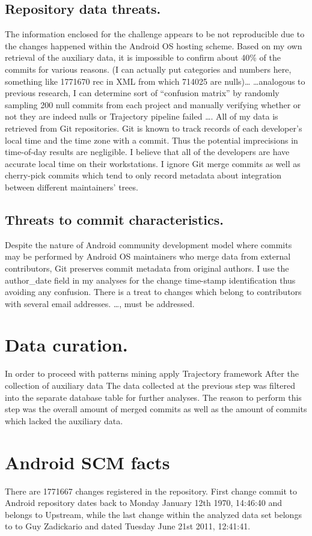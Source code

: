 \documentclass[a4paper,10pt]{article}
\numberwithin{equation}{subsection}
\begin{document}
\subsection{Repository data threats.}
The information enclosed for the challenge appears to be not reproducible due to the changes happened 
within the Android OS hosting scheme. Based on my own retrieval of the auxiliary data, it is impossible 
to confirm about 40\% of the commits for various reasons. 
(I can actually put categories and numbers here, something like
1771670 rec in XML from which 714025 are nulls)\ldots 
\ldots analogous to previous research, I can determine sort of ``confusion matrix'' by 
randomly sampling 200 null commits from each project and manually verifying whether or not they 
are indeed nulls or Trajectory pipeline failed \ldots. 
All of my data is retrieved from Git repositories. Git is known to track records of each 
developer’s local time and the time zone with a commit. Thus the potential imprecisions
in time-of-day results are negligible. I believe that all of the developers are have accurate local 
time on their workstations.
I ignore Git merge commits as well as cherry-pick commits which tend to only record metadata about 
integration between different maintainers’ trees.

\subsection{Threats to commit characteristics.}
Despite the nature of Android community development model where commits may be performed by 
Android OS maintainers who merge data from external contributors, Git preserves commit metadata 
from original authors. I use the author\_date field in my analyses for the change time-stamp identification 
thus avoiding any confusion.
There is a treat to changes which belong to contributors with several email addresses. \ldots, must be addressed.

\section{Data curation.}
In order to proceed with patterns mining apply Trajectory framework After the collection of auxiliary data The data collected at the previous step was filtered into the separate database table for further analyses.
The reason to perform this step was the overall amount of merged commits as well as the amount of commits
which lacked the auxiliary data.

\section{Android SCM facts}
There are 1771667 changes registered in the repository. First change commit to Android repository dates back 
to Monday January 12th 1970, 14:46:40 and belongs to Upstream, while the last change
within the analyzed data set belongs to to Guy Zadickario and dated 
Tuesday June 21st 2011, 12:41:41.
\end{document}
